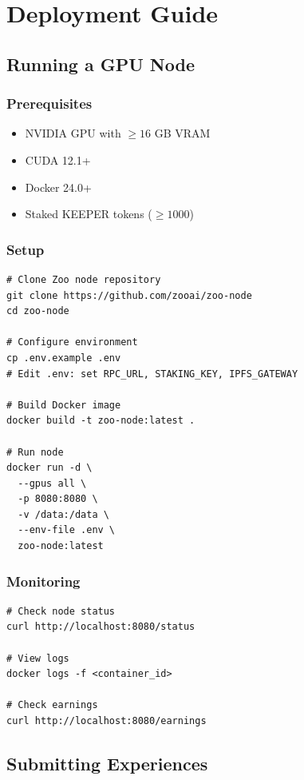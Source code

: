 \section{Deployment Guide}


\subsection{Running a GPU Node}

\subsubsection{Prerequisites}
\begin{itemize}
\item NVIDIA GPU with $\geq 16$ GB VRAM
\item CUDA 12.1+
\item Docker 24.0+
\item Staked KEEPER tokens ($\geq 1000$)
\end{itemize}

\subsubsection{Setup}
\begin{verbatim}
# Clone Zoo node repository
git clone https://github.com/zooai/zoo-node
cd zoo-node

# Configure environment
cp .env.example .env
# Edit .env: set RPC_URL, STAKING_KEY, IPFS_GATEWAY

# Build Docker image
docker build -t zoo-node:latest .

# Run node
docker run -d \
  --gpus all \
  -p 8080:8080 \
  -v /data:/data \
  --env-file .env \
  zoo-node:latest
\end{verbatim}

\subsubsection{Monitoring}
\begin{verbatim}
# Check node status
curl http://localhost:8080/status

# View logs
docker logs -f <container_id>

# Check earnings
curl http://localhost:8080/earnings
\end{verbatim}

\subsection{Submitting Experiences}


